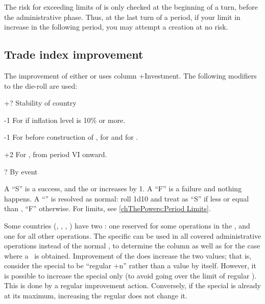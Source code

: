 \begin{designnote}
  The risk for exceeding limits of \MNU is only checked at the beginning of a
  turn, before the administrative phase. Thus, at the last turn of a period,
  if your limit in \MNU increase in the following period, you may attempt a
  \MNU creation at no risk.

\end{designnote}



\subsection{Trade index improvement}

\aparag The improvement of either \FTI or \DTI uses column +Investment.
\bparag The following modifiers to the die-roll are used:
\begin{modlist}
\item[+?]Stability of country
\item[-1]For \SPA if inflation level is 10\% or more.
\item[-1]For \RUS before construction of , for \TUR
  and for \POL.
\item[+2]For \ENG, from period VI onward.
\item[\textplusminus?]By event
\end{modlist}
\bparag A ``S'' is a success, and the \FTI or \DTI increases by 1.
\bparag A ``F'' is a failure and nothing happens.
\bparag A ``\undemi'' is resolved as normal: roll 1d10 and treat as ``S'' if
less or equal than \FTI, ``F'' otherwise.
\bparag For limits, see \ref{chThePowers:Period Limits}.

\label{chAdministration:Special FTI} Some countries
(\POR, \RUS, \SPA, \HOL) have two \FTI: one reserved for some operations in
the \ROTW, and one for all other operations.
\bparag The specific \FTI can be used in all covered administrative operations
instead of the normal \FTI, to determine the column as well as for the case
where a \undemi\ is obtained.
\bparag Improvement of the \FTI does increase the two values; that is,
consider the special \FTI to be ``regular \FTI +n'' rather than a value by
itself.
\bparag However, it is possible to increase the special \FTI only (to avoid
going over the limit of regular \FTI). This is done by a regular \FTI
improvement action.
\bparag Conversely, if the special \FTI is already at its maximum, increasing
the regular \FTI does not change it.

